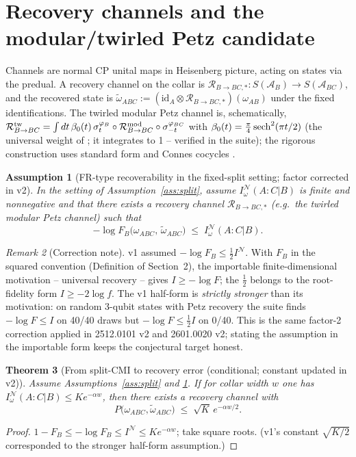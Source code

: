 \documentclass[11pt]{article}
\newtheorem{theorem}{Theorem}[section]
\newtheorem{assumption}[theorem]{Assumption}
\theoremstyle{remark}
\newtheorem{remark}[theorem]{Remark}
\begin{document}
\section{Recovery channels and the modular/twirled Petz candidate}
Channels are normal CP unital maps in Heisenberg picture, acting on states
via the predual. A recovery channel on the collar is
$\mathcal{R}_{B\to BC,*}: S(\mathcal{A}_B) \to S(\mathcal{A}_{BC})$, and
the recovered state is $\tilde\omega_{ABC} := (\mathrm{id}_A \otimes
\mathcal{R}_{B\to BC,*})(\omega_{AB})$ under the fixed identifications.
The twirled modular Petz channel is, schematically,
$\mathcal{R}^{\rm tw}_{B\to BC} = \int dt\, \beta_0(t)\, \sigma^{\varphi_B}_t
\circ \mathcal{R}^{\rm mod}_{B\to BC} \circ \sigma^{\varphi_{BC}}_{-t}$
with $\beta_0(t) = \tfrac{\pi}{4}\,{\rm sech}^2(\pi t/2)$ (the universal
weight of \cite{JRSWW}; it integrates to 1 -- verified in the suite); the
rigorous construction uses standard form and Connes cocycles \cite{JRSWW,
SutterTH}.

\begin{assumption}[FR-type recoverability in the fixed-split setting;
factor corrected in v2]
\label{ass:fr}
In the setting of Assumption~\ref{ass:split}, assume
$I^{\mathcal{N}}_\omega(A:C|B)$ is finite and nonnegative and that there
exists a recovery channel $\mathcal{R}_{B\to BC,*}$ (e.g.\ the twirled
modular Petz channel) such that
\[
-\log F_B\bigl(\omega_{ABC},\, \tilde\omega_{ABC}\bigr) \;\le\;
I^{\mathcal{N}}_\omega(A:C|B).
\]
\end{assumption}
\begin{remark}[Correction note]
\label{rem:frfix}
v1 assumed $-\log F_B \le \tfrac12 I^{\mathcal{N}}$. With $F_B$ in the
squared convention (Definition of Section~2), the importable
finite-dimensional motivation -- universal recovery \cite{FR, JRSWW} --
gives $I \ge -\log F$; the $\tfrac12$ belongs to the root-fidelity form
$I \ge -2\log f$. The v1 half-form is \emph{strictly stronger} than its
motivation: on random 3-qubit states with Petz recovery the suite finds
$-\log F \le I$ on 40/40 draws but $-\log F \le \tfrac12 I$ on 0/40.
This is the same factor-2 correction applied in 2512.0101 v2 and
2601.0020 v2; stating the assumption in the importable form keeps the
conjectural target honest.
\end{remark}

\begin{theorem}[From split-CMI to recovery error (conditional; constant
updated in v2)]
\label{thm:main}
Assume Assumptions~\ref{ass:split} and \ref{ass:fr}. If for collar width
$w$ one has $I^{\mathcal{N}}_\omega(A:C|B) \le K e^{-\alpha w}$, then
there exists a recovery channel with
\[
P\bigl(\omega_{ABC}, \tilde\omega_{ABC}\bigr) \;\le\; \sqrt{K}\,
e^{-\alpha w/2}.
\]
\end{theorem}
\begin{proof}
$1 - F_B \le -\log F_B \le I^{\mathcal{N}} \le K e^{-\alpha w}$; take
square roots. (v1's constant $\sqrt{K/2}$ corresponded to the stronger
half-form assumption.)
\end{proof}
\end{document}
